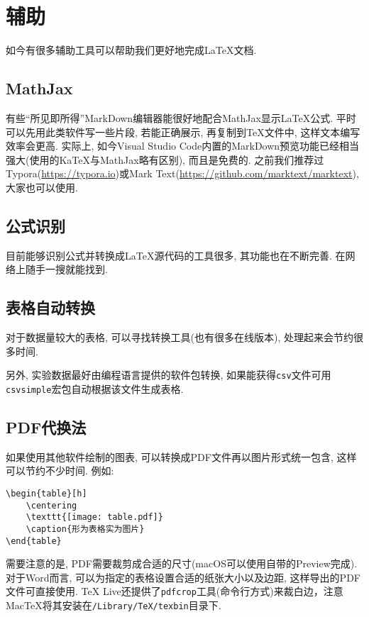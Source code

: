 \chapter{辅助}

如今有很多辅助工具可以帮助我们更好地完成\LaTeX{}文档.

\section{MathJax}

有些``所见即所得''MarkDown编辑器能很好地配合MathJax显示\LaTeX{}公式.
平时可以先用此类软件写一些片段, 若能正确展示, 再复制到\TeX{}文件中, 这样文本编写效率会更高.
实际上, 如今Visual Studio Code内置的MarkDown预览功能已经相当强大(使用的KaTeX与MathJax略有区别),
而且是免费的.
之前我们推荐过Typora(\url{https://typora.io})或Mark Text(\url{https://github.com/marktext/marktext}), 大家也可以使用.

\section{公式识别}

目前能够识别公式并转换成\LaTeX{}源代码的工具很多, 其功能也在不断完善. 在网络上随手一搜就能找到.


\section{表格自动转换}

对于数据量较大的表格, 可以寻找转换工具(也有很多在线版本), 处理起来会节约很多时间.

另外, 实验数据最好由编程语言提供的软件包转换, 如果能获得\texttt{csv}文件可用\texttt{csvsimple}宏包自动根据该文件生成表格.

\section{PDF代换法}

如果使用其他软件绘制的图表, 可以转换成PDF文件再以图片形式统一包含, 这样可以节约不少时间.
例如:
\begin{Verbatim}
\begin{table}[h]
    \centering
    \texttt{[image: table.pdf]}
    \caption{形为表格实为图片}
\end{table}
\end{Verbatim}
需要注意的是, PDF需要裁剪成合适的尺寸(macOS可以使用自带的Preview完成).
对于Word而言, 可以为指定的表格设置合适的纸张大小以及边距, 这样导出的PDF文件可直接使用.
TeX Live还提供了\texttt{pdfcrop}工具(命令行方式)来裁白边，注意MacTeX将其安装在\texttt{/Library/TeX/texbin}目录下.
